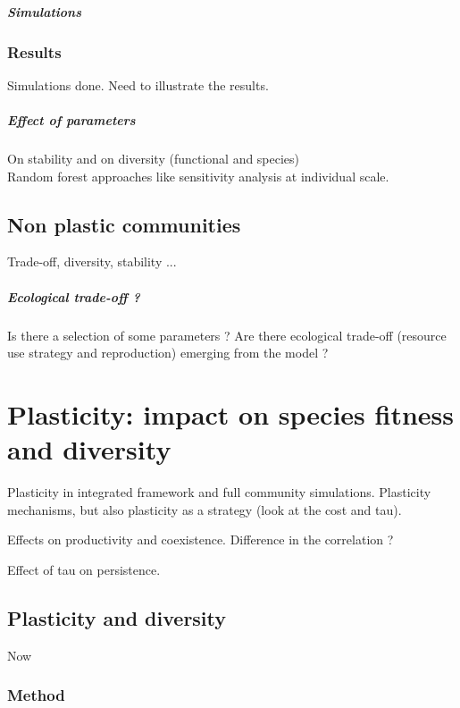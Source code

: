 \paragraph{Simulations}

\subsection{Results}

Simulations done. Need to illustrate the results.\\

\paragraph{Effect of parameters}
On stability and on diversity (functional and species)\\
Random forest approaches like sensitivity analysis at individual scale.


\section{Non plastic communities}
Trade-off, diversity, stability ...


\paragraph{Ecological trade-off ?}
Is there a selection of some parameters ? Are there ecological trade-off (resource use strategy and reproduction) emerging from the model ?

\chapter{Plasticity: impact on species fitness and diversity}

Plasticity in integrated framework and full community simulations. Plasticity mechanisms, but also plasticity as a strategy (look at the cost and tau). 

Effects on productivity and coexistence. Difference in the correlation ?

Effect of tau on persistence.

\section{Plasticity and diversity}

Now 

\subsection{Method}

